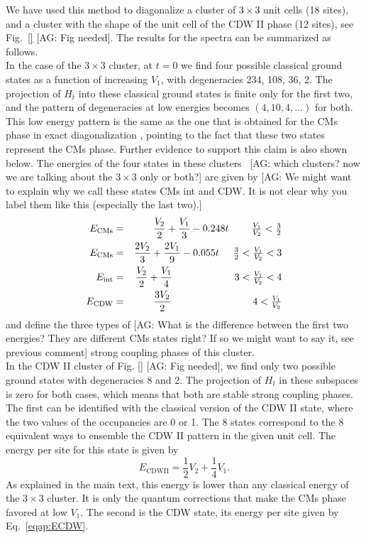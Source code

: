 \documentclass[aps,prx,10pt,twocolumn,floatfix,superscriptaddress,showpacs,numerical,footinbib]{revtex4-1}
\newcommand{\noteAG}[1]{{\color{blue} [AG: #1]}}
\begin{document}
We have used this method to diagonalize a cluster of $3\times3$ unit cells (18 sites), and a cluster with the shape of the unit cell of the CDW II phase (12 sites), see Fig.~\ref{}\noteAG{Fig needed}. The results for the spectra can be summarized as follows. \\
%
In the case of the $3\times3$ cluster, at $t=0$ we find four possible classical ground states as a function of increasing $V_1$, with degeneracies 234, 108, 36, 2.
%
The projection of $H_t$ into these classical ground states is finite only for the first two, and the pattern of degeneracies at low energies becomes $(4,10,4,\ldots)$ for both.
%
This low energy pattern is the same as the one that is obtained for the CMs phase in exact diagonalization \cite{GGNVC13}, 
pointing to the fact that these two states represent the CMs phase.
%
Further evidence to support this claim is also shown below. 
%
The energies of the four states in these clusters~\noteAG{which clusters? now we are talking about the $3\times 3$ only or both?} are given by
\noteAG{We might want to explain why we call these states CMs int and CDW. It is not clear why you label them like this (especially the last two).}
%
\begin{eqnarray}
E_{\mathrm{CMs}} &=& \frac{V_2}{2} + \frac{V_1}{3} -0.248t \hspace{8mm} \tfrac{V_1}{V_2} < \tfrac{3}{2}\\
E_{\mathrm{CMs}} &=& \frac{2V_2}{3} + \frac{2V_1}{9} -0.055t \hspace{5mm}   \tfrac{3}{2} <\tfrac{V_1}{V_2} < 3\\
E_{\mathrm{int}} &=& \frac{V_2}{2} + \frac{V_1}{4} \hspace{22mm}   3 <\tfrac{V_1}{V_2} < 4\\
\label{eqap:ECDW}
E_{\mathrm{CDW}} &=& \frac{3V_2}{2}   \hspace{29mm}   4 < \tfrac{V_1}{V_2}
\end{eqnarray}
%
and define the three types of \noteAG{What is the difference between the first two energies? They are different CMs states right? If so
we might want to say it, see previous comment} strong coupling phases of this cluster.\\
%
In the CDW II cluster of Fig. \ref{}\noteAG{Fig needed}, we find only two possible ground states with degeneracies 8 and 2.
% 
The projection of $H_t$ in these subspaces is zero for both cases, which means that both are stable strong coupling phases.
%
The first can be identified with the classical version of the CDW II state, where the two values of the occupancies are 0 or 1.
%
The 8 states correspond to the 8 equivalent ways to ensemble the CDW II pattern in the given unit cell. 
%
The energy per site for this state is given by
%
\begin{equation}
E_{\mathrm{CDWII}} = \frac{1}{2}V_2 + \frac{1}{4}V_1.
\end{equation}
%
As explained in the main text, this energy is lower than any classical energy of the $3\times3$ cluster. It is only the quantum corrections that make the CMs phase favored at low $V_1$. 
The second is the CDW state, its energy per site given by Eq.~\eqref{eqap:ECDW}.
\end{document}
